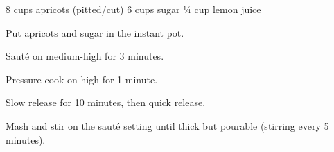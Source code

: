 \dishtype{\vegetarian, \sauce}
\begin{ingreds}
    8 cups apricots (pitted/cut)
    6 cups sugar
    ¼ cup lemon juice
\end{ingreds}
\begin{method}
    Put apricots and sugar in the instant pot.\par
    Saut\'e on medium-high for 3 minutes.\par
    Pressure cook on high for 1 minute.\par
    Slow release for 10 minutes, then quick release.\par
    Mash and stir on the saut\'e setting until thick but pourable (stirring every 5 minutes).
\end{method}